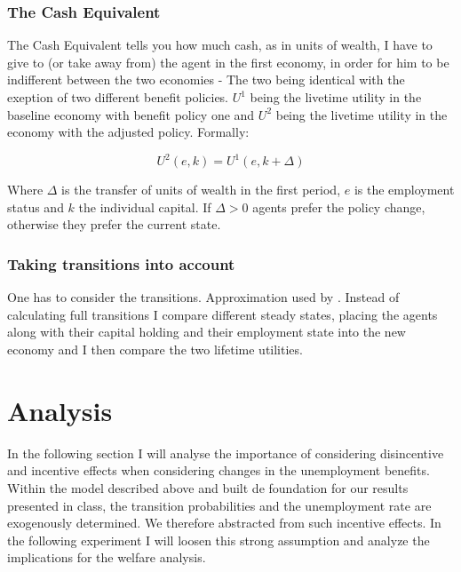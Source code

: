 \documentclass[a4paper,12pt]{article}
\begin{document}
\subsubsection*{The Cash Equivalent}

The Cash Equivalent tells you how much cash, as in units of wealth, I have to give to (or take away from) the agent in the first economy, in order for him to be indifferent between the two economies - The two being identical with the exeption of two different benefit policies. $U^{1}$ being the livetime utility in the baseline economy with benefit policy one and $U^{2}$ being the livetime utility in the economy with the adjusted policy. Formally: 

  \begin{equation}
  U^{2}(e,k) = U^{1}(e,k+\Delta) \nonumber
  \end{equation}

Where $\Delta$ is the transfer of units of wealth in the first period, $e$ is the employment status and $k$ the individual capital. If $ \Delta>0 $ agents prefer the policy change, otherwise they prefer the current state. 

\subsubsection*{Taking transitions into account}

One has to consider the transitions. Approximation used by \cite{KrusellMukoyamaSahin}. Instead of calculating full transitions I compare different steady states, placing the agents along with their capital holding and their employment state into the new economy and I then compare the two lifetime utilities. 




\section{Analysis}

In the following section I will analyse the importance of considering disincentive and incentive effects when considering changes in the unemployment benefits. Within the model described above and built de foundation for our results presented in class, the transition probabilities and the unemployment rate are exogenously determined. We therefore abstracted from such incentive effects. In the following experiment I will loosen this strong assumption and analyze the implications for the welfare analysis. 
\end{document}
